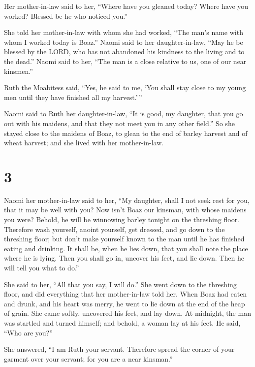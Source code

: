  Her mother-in-law said to her, ``Where have you gleaned
today? Where have you worked? Blessed be he who noticed you.''

She told her mother-in-law with whom she had worked, ``The man's name
with whom I worked today is Boaz.''  Naomi said to her
daughter-in-law, ``May he be blessed by the LORD, who has not abandoned
his kindness to the living and to the dead.'' Naomi said to her, ``The
man is a close relative to us, one of our near kinsmen.''

 Ruth the Moabitess said, ``Yes, he said to me, `You shall
stay close to my young men until they have finished all my harvest.'\,''

 Naomi said to Ruth her daughter-in-law, ``It is good, my
daughter, that you go out with his maidens, and that they not meet you
in any other field.''  So she stayed close to the maidens
of Boaz, to glean to the end of barley harvest and of wheat harvest; and
she lived with her mother-in-law.

\hypertarget{section-2}{%
\section{3}\label{section-2}}

 Naomi her mother-in-law said to her, ``My daughter, shall I
not seek rest for you, that it may be well with you?  Now
isn't Boaz our kinsman, with whose maidens you were? Behold, he will be
winnowing barley tonight on the threshing floor.  Therefore
wash yourself, anoint yourself, get dressed, and go down to the
threshing floor; but don't make yourself known to the man until he has
finished eating and drinking.  It shall be, when he lies
down, that you shall note the place where he is lying. Then you shall go
in, uncover his feet, and lie down. Then he will tell you what to do.''

 She said to her, ``All that you say, I will do.''
 She went down to the threshing floor, and did everything
that her mother-in-law told her.  When Boaz had eaten and
drunk, and his heart was merry, he went to lie down at the end of the
heap of grain. She came softly, uncovered his feet, and lay down.
 At midnight, the man was startled and turned himself; and
behold, a woman lay at his feet.  He said, ``Who are you?''

She answered, ``I am Ruth your servant. Therefore spread the corner of
your garment over your servant; for you are a near kinsman.''

